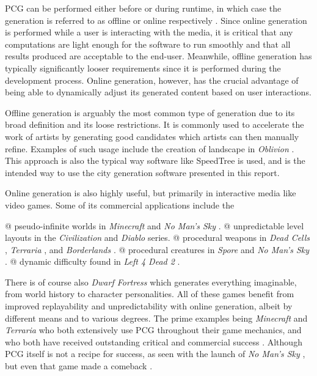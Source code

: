 PCG can be performed either before or during runtime, in which case the generation is referred to as offline or online respectively \cite[p. 7-8]{pcg_in_games}.
Since online generation is performed while a user is interacting with the media, it is critical that any computations are light enough for the software to run smoothly and that all results produced are acceptable to the end-user.
Meanwhile, offline generation has typically significantly looser requirements since it is performed during the development process.
Online generation, however, has the crucial advantage of being able to dynamically adjust its generated content based on user interactions.

Offline generation is arguably the most common type of generation due to its broad definition and its loose restrictions.
It is commonly used to accelerate the work of artists by generating good candidates which artists can then manually refine. Examples of such usage include the creation of landscape in \textit{Oblivion} \cite{elder_scrolls_iv}.
This approach is also the typical way software like SpeedTree \cite{speedtree} is used, and is the intended way to use the city generation software presented in this report.

Online generation is also highly useful, but primarily in interactive media like video games.
Some of its commercial applications include the
\begin{easylist}
  @ pseudo-infinite worlds in \textit{Minecraft} \cite{minecraft} and \textit{No Man's Sky} \cite{no_man_sky}.
  @ unpredictable level layouts in the \textit{Civilization} \cite{civilization} and \textit{Diablo} \cite{diablo} series.
  @ procedural weapons in \textit{Dead Cells} \cite{dead_cells}, \textit{Terraria} \cite{terraria}, and \textit{Borderlands} \cite{borderlands}.
  @ procedural creatures in \textit{Spore} \cite{spore} \cite{pcg_for_everyone} and \textit{No Man's Sky} \cite{no_man_sky}.
  @ dynamic difficulty found in \textit{Left 4 Dead 2} \cite{left_4_dead_2}.
\end{easylist}
There is of course also \textit{Dwarf Fortress} \cite{dwarf_fortress} which generates everything imaginable, from world history to character personalities.
All of these games benefit from improved replayability and unpredictability with online generation, albeit by different means and to various degrees.
The prime examples being \textit{Minecraft} and \textit{Terraria} who both extensively use PCG throughout their game mechanics, and who both have received outstanding critical and commercial success \cite{minecraft_reviews} \cite{minecraft_commercial} \cite{terraria_reviews} \cite{terraria_commercial}.
Although PCG itself is not a recipe for success, as seen with the launch of \textit{No Man's Sky} \cite{no_man_sky_launch}, but even that game made a comeback \cite{no_man_sky_comeback}.

